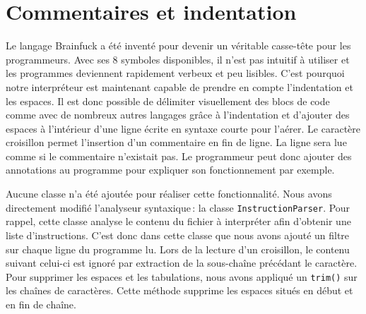 \documentclass[titlepage]{article}
\begin{document}
\section{Commentaires et indentation}
    Le langage Brainfuck a été inventé pour devenir un véritable casse-tête pour les programmeurs. Avec ses 8 symboles disponibles, il n’est pas intuitif à utiliser et les programmes deviennent rapidement verbeux et peu lisibles. C’est pourquoi notre interpréteur est maintenant capable de prendre en compte l’indentation et les espaces. Il est donc possible de délimiter visuellement des blocs de code comme avec de nombreux autres langages grâce à l'indentation et d’ajouter des espaces à l’intérieur d’une ligne écrite en syntaxe courte pour l’aérer. Le caractère croisillon permet l'insertion d'un commentaire en fin de ligne. La ligne sera lue comme si le commentaire n’existait pas. Le programmeur peut donc ajouter des annotations au programme pour expliquer son fonctionnement par exemple.

    Aucune classe n’a été ajoutée pour réaliser cette fonctionnalité. Nous avons directement modifié l'analyseur syntaxique : la classe \texttt{InstructionParser}. Pour rappel, cette classe analyse le contenu du fichier à interpréter afin d’obtenir une liste d’instructions. C’est donc dans cette classe que nous avons ajouté un filtre sur chaque ligne du programme lu. Lors de la lecture d’un croisillon, le contenu suivant celui-ci est ignoré par extraction de la sous-chaîne précédant le caractère. Pour supprimer les espaces et les tabulations, nous avons appliqué un \texttt{trim()} sur les chaînes de caractères. Cette méthode supprime les espaces situés en début et en fin de chaîne.
\end{document}
